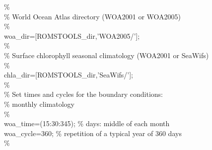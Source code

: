 \%\\
\% World Ocean Atlas directory (WOA2001 or WOA2005) \\
\%\\
woa\_dir=[ROMSTOOLS\_dir,'WOA2005/'];\\
\%\\
\% Surface chlorophyll seasonal climatology (WOA2001 or SeaWifs)\\
\%\\
chla\_dir=[ROMSTOOLS\_dir,'SeaWifs/'];\\
\%\\
\%  Set times and cycles for the boundary conditions:\\ 
\%   monthly climatology \\
\%\\
woa\_time=(15:30:345); \% days: middle of each month\\
woa\_cycle=360;        \% repetition of a typical year of 360 days\\  
\%\\

